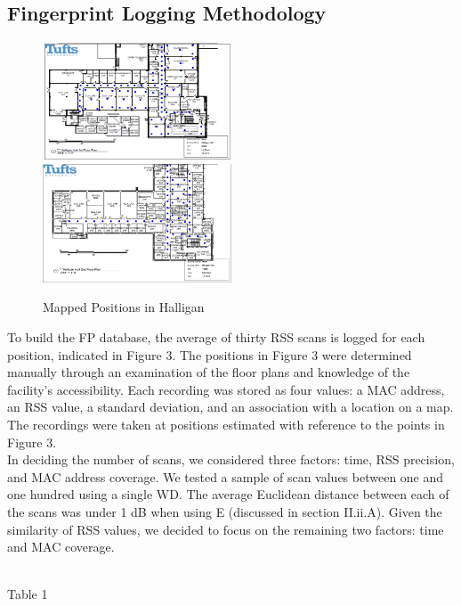 \documentclass[conference]{IEEEtran}
\begin{document}
\subsection{Fingerprint Logging Methodology}

\begin{figure}[h!] 
  \centering
    \includegraphics[width=0.5\textwidth]{firstFloor.png}
    \includegraphics[width=0.5\textwidth]{secondFloor.png}
     \caption{Mapped Positions in Halligan}
\end{figure}

To build the FP database, the average of thirty RSS scans is logged for each position, indicated in Figure 3. The positions in Figure 3 were determined manually through an examination of the floor plans and knowledge of the facility's accessibility. Each recording was stored as four values: a MAC address, an RSS value, a standard deviation, and an association with a location on a map. The recordings were taken at positions estimated with reference to the points in Figure 3.\\
\indent In deciding the number of scans, we considered three factors: time, RSS precision, and MAC address coverage. We tested a sample of scan values between one and one hundred using a single WD. The average Euclidean distance between each of the scans was under 1 dB when using E (discussed in section II.ii.A). Given the similarity of RSS values, we decided to focus on the remaining two factors: time and MAC coverage. \\
\vspace{5mm}\\
\begin{center}
Table 1
\end{center}
\end{document}
